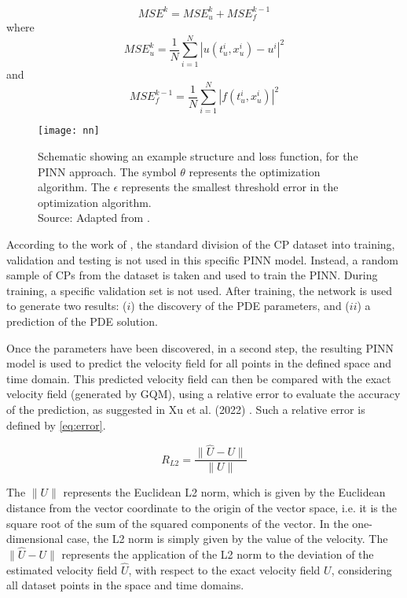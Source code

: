 \begin{minipage}[htb]{.95\columnwidth}\bigskip\begin{equation}
MSE^k = MSE_u^k + MSE_f^{k-1}
\label{eq:mse}\end{equation}
where
$$ MSE_u^k = \frac{1}{N}\sum_{i=1}^{N}|u(t^i_u, x^i_u)-u^i|^2 $$
and
$$ MSE_f^{k-1} = \frac{1}{N}\sum_{i=1}^{N}|f(t^i_u, x^i_u)|^2 $$
\bigskip\end{minipage}%

\begin{figure}[htb]\centering
\texttt{[image: nn]}
\caption{Schematic showing an example structure and loss function, for the PINN approach. The symbol $\theta$ represents the optimization algorithm. The $\epsilon$ represents the smallest threshold error in the optimization algorithm.\\
Source: Adapted from .}
\label{fig:nn}
\end{figure}

According to the work of , the standard division of the CP dataset into training, validation and testing is not used in this specific PINN model. Instead, a random sample of CPs from the dataset is taken and used to train the PINN. During training, a specific validation set is not used. After training, the network is used to generate two results: ($i$) the discovery of the PDE parameters, and ($ii$) a prediction of the PDE solution.

Once the parameters have been discovered, in a second step, the resulting PINN model is used to predict the velocity field for all points in the defined space and time domain. This predicted velocity field can then be compared with the exact velocity field (generated by GQM), using a relative error to evaluate the accuracy of the prediction, as suggested in Xu et al. (2022) \cite{Xu2022}. Such a relative error is defined by \autoref{eq:error}.

\begin{equation}
R_{L2} = \frac{\| \widehat{U} - U \|}{\|U\|}
\label{eq:error}
\end{equation}

The $\|U\|$ represents the Euclidean L2 norm, which is given by the Euclidean distance from the vector coordinate to the origin of the vector space, i.e. it is the square root of the sum of the squared components of the vector. In the one-dimensional case, the L2 norm is simply given by the value of the velocity.
The $\| \widehat{U} - {U} \| $ represents the application of the L2 norm to the deviation of the estimated velocity field $\widehat{U}$, with respect to the exact velocity field $U$, considering all dataset points in the space and time domains.

